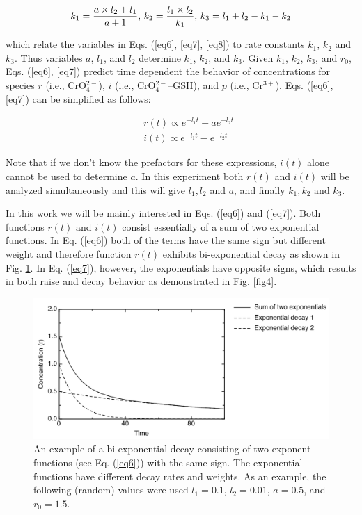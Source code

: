 \documentclass[byrevtex,amssymb,aps,pra,floatfix,letterpaper]{revtex4}
\begin{document}
\begin{equation}
\label{eq9}
k_1 = \frac{a\times l_2 + l_1}{a + 1}\textnormal{, }k_2 = \frac{l_1\times l_2}{k_1}\textnormal{, }k_3 = l_1 + l_2 - k_1 - k_2
\end{equation}

\noindent
which relate the variables in Eqs. (\ref{eq6}, \ref{eq7}, \ref{eq8}) to rate constants $k_1$, $k_2$ and $k_3$. Thus variables $a$, $l_1$, and $l_2$ determine $k_1$, $k_2$, and $k_3$. Given $k_1$, $k_2$, $k_3$, and $r_0$, Eqs. (\ref{eq6}, \ref{eq7}) predict time dependent the behavior of concentrations for species $r$ (i.e., CrO$_4^ {2-}$), $i$ (i.e., CrO$_4^{2-}$--GSH), and $p$ (i.e., Cr$^{3+}$). Eqs. (\ref{eq6}, \ref{eq7}) can be simplified as follows:

\begin{eqnarray}
\label{eq67a}
& & r(t) \propto e^{-l_1t} + a e^{-l_2t}\\
& & i(t) \propto e^{-l_1t} - e^{-l_2t}
\end{eqnarray}

\noindent
Note that if we don't know the prefactors for these expressions, $i(t)$ alone cannot be used to determine $a$. In this experiment both $r(t)$ and $i(t)$ will be analyzed simultaneously and this will give $l_1, l_2$ and $a$, and finally $k_1, k_2$ and $k_3$.

In this work we will be mainly interested in Eqs. (\ref{eq6}) and (\ref{eq7}). Both functions $r(t)$ and $i(t)$ consist essentially of a sum of two exponential functions. In Eq. (\ref{eq6}) both of the terms have the same sign but different weight and therefore function $r(t)$ exhibits bi-exponential decay as shown in Fig. \ref{fig3}. In Eq. (\ref{eq7}), however, the exponentials have opposite signs, which results in both raise and decay behavior as demonstrated in Fig. \ref{fig4}.

\begin{figure}[!htp]
\begin{center}
\includegraphics[scale=0.5]{fig3}
\caption{An example of a bi-exponential decay consisting of two exponent functions (see Eq. (\ref{eq6})) with the same sign. The exponential functions have different decay rates and weights. As an example, the following (random) values were used $l_1 = 0.1$, $l_2 = 0.01$, $a = 0.5$, and $r_0 = 1.5$.}
\label{fig3}
\end{center}
\end{figure}
\end{document}
